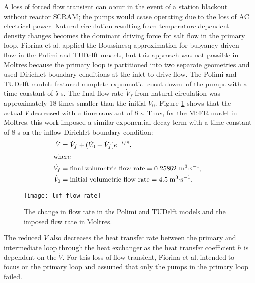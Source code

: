 A loss of forced flow transient can occur in the event of a station blackout
without reactor SCRAM; the pumps would cease operating due to the loss of AC
electrical
power. Natural circulation resulting from temperature-dependent density
changes becomes the dominant driving force for salt flow in the primary loop.
Fiorina et al. \cite{fiorina_modelling_2014} applied the Boussinesq
approximation for buoyancy-driven flow in the Polimi and TUDelft models, but
this approach was not possible in Moltres because the primary loop is
partitioned into two separate geometries and used Dirichlet boundary
conditions at the inlet to drive flow. The Polimi and TUDelft
models featured complete exponential coast-downs of the pumps with a time
constant of 5 s. The final flow rate $\dot{V}_f$ from natural circulation
was approximately 18 times smaller than the initial $\dot{V}_0$. Figure
\ref{fig:flowrate} shows that the actual $\dot{V}$ decreased with a time
constant of 8 s. Thus, for the \gls{MSFR} model in Moltres, this work imposed
a similar exponential decay term with a time constant of 8 s on the inflow
Dirichlet boundary condition:
%
\begin{align}
    \dot{V} &= \dot{V}_f + (\dot{V}_0-\dot{V}_f) e^{-t/8},
    \label{eq:flowrate} \\
    \intertext{where}
    \dot{V}_f &= \text{final volumetric flow rate} = 0.25862
    \text{ m$^3\cdot$s$^{-1}$,} \nonumber \\
    \dot{V}_0 &= \text{initial volumetric flow rate} = 4.5
    \text{ m$^3\cdot$s$^{-1}$.} \nonumber
\end{align}
%
\begin{figure}[htbp!]
    \centering
    \texttt{[image: lof-flow-rate]}
    \caption{The change in flow rate in the Polimi and TUDelft models and the
    imposed flow rate in Moltres.}
    \label{fig:flowrate}
\end{figure}
%
The reduced $\dot{V}$ also decreases the heat transfer rate between the
primary and intermediate loop through the heat exchanger as the heat transfer
coefficient $h$ is dependent on the $\dot{V}$. For this loss of flow
transient, Fiorina et al. \cite{fiorina_modelling_2014} intended to focus
on the primary loop and assumed that only the pumps in the primary loop
failed.

